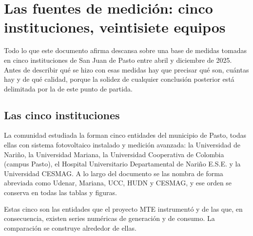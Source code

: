 %
%
\section{Las fuentes de medición: cinco instituciones, veintisiete equipos}
\label{sec:dato}
\justifying

Todo lo que este documento afirma descansa sobre una base de medidas
tomadas en cinco instituciones de San Juan de Pasto entre abril y
diciembre de 2025. Antes de describir qué se hizo con esas medidas hay que precisar
qué son, cuántas hay y de qué calidad, porque la solidez de
cualquier conclusión posterior está delimitada por la de este punto de
partida.

\subsection{Las cinco instituciones}
\label{sub:dato-instituciones}

La comunidad estudiada la forman cinco entidades del municipio de Pasto,
todas ellas con sistema fotovoltaico instalado y medición avanzada: la
Universidad de Nariño, la Universidad Mariana, la Universidad Cooperativa
de Colombia (campus Pasto), el Hospital Universitario Departamental de
Nariño E.S.E. y la Universidad CESMAG. A lo largo del documento se
las nombra de forma abreviada como Udenar, Mariana, UCC, HUDN y CESMAG, y
ese orden se conserva en todas las tablas y figuras.

Estas cinco son las entidades que el proyecto MTE instrumentó y de las
que, en consecuencia, existen series numéricas de generación y de consumo.
La comparación se construye alrededor de ellas.

